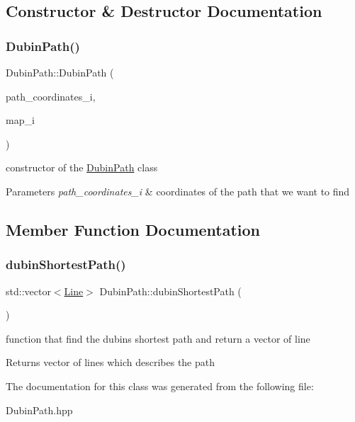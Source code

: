 \subsection{Constructor \& Destructor Documentation}
\mbox{\label{class_dubin_path_a2acdccca5f08b09708ea41b21d2b7e04}} 
\subsubsection{\texorpdfstring{Dubin\+Path()}{DubinPath()}}
{\footnotesize\ttfamily Dubin\+Path\+::\+Dubin\+Path (\begin{DoxyParamCaption}\item[{\mbox{\hyperlink{class_path_coordinates}{Path\+Coordinates}}}]{path\+\_\+coordinates\+\_\+i,  }\item[{\mbox{\hyperlink{class_map}{Map}} $\ast$}]{map\+\_\+i }\end{DoxyParamCaption})}



constructor of the \mbox{\hyperlink{class_dubin_path}{Dubin\+Path}} class 


\begin{DoxyParams}{Parameters}
{\em path\+\_\+coordinates\+\_\+i} & coordinates of the path that we want to find \\
\hline
\end{DoxyParams}


\subsection{Member Function Documentation}
\mbox{\label{class_dubin_path_a260513ceab4e25a5a8867ea2701fbb68}} 
\subsubsection{\texorpdfstring{dubin\+Shortest\+Path()}{dubinShortestPath()}}
{\footnotesize\ttfamily std\+::vector$<$\mbox{\hyperlink{class_line}{Line}}$>$ Dubin\+Path\+::dubin\+Shortest\+Path (\begin{DoxyParamCaption}{ }\end{DoxyParamCaption})}



function that find the dubins shortest path and return a vector of line 

\begin{DoxyReturn}{Returns}
vector of lines which describes the path 
\end{DoxyReturn}


The documentation for this class was generated from the following file\+:\begin{DoxyCompactItemize}
\item 
Dubin\+Path.\+hpp\end{DoxyCompactItemize}

